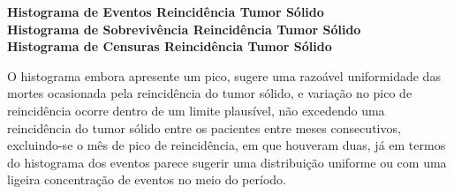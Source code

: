 \documentclass[12pt,a4paper]{article}
\begin{document}
	\begin{center}
		\vspace{1cm}
		\textbf{Histograma de Eventos Reincidência Tumor Sólido}
		\vspace{1cm}\\
		\textbf{Histograma de Sobrevivência Reincidência Tumor Sólido}
		\vspace{1cm}\\
		\textbf{Histograma de Censuras Reincidência Tumor Sólido}
	\end{center}
	\vspace{1cm}
	O histograma embora apresente um pico, sugere uma razoável uniformidade das mortes ocasionada pela reincidência do tumor sólido, e variação no pico de reincidência ocorre dentro de um limite plausível, não excedendo uma reincidência do tumor sólido entre os pacientes entre meses consecutivos, excluindo-se o mês de pico de reincidência, em que houveram duas, já em termos do histograma dos eventos parece sugerir uma distribuição uniforme ou com uma ligeira concentração de eventos no meio do período. 
	\vspace{1cm}\\
\end{document}
